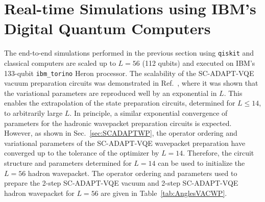 \documentclass[aps, prc, tightenlines,superscriptaddress, letterpaper, amsmath, amssymb, preprintnumbers, floatfix, longbibliography, nofootinbib]{revtex4-2}
\begin{document}
\section{Real-time Simulations using IBM's Digital Quantum Computers}
\label{sec:Qsim}
\noindent
The end-to-end simulations performed in the previous section using {\tt qiskit} and classical computers are scaled up to $L=56$ (112 qubits) 
and executed on IBM's 133-qubit {\tt ibm\_torino} Heron processor.
The scalability of the SC-ADAPT-VQE vacuum preparation circuits was demonstrated in Ref.~\cite{Farrell:2023fgd}, where it was shown that the variational parameters are reproduced well by an exponential in $L$.
This enables the extrapolation of the state preparation circuits, determined for $L\leq 14$, to arbitrarily large $L$.
In principle, a similar exponential convergence of parameters for the hadronic wavepacket preparation circuits is expected. 
However, as shown in Sec.~\ref{sec:SCADAPTWP}, the operator ordering and variational parameters of the SC-ADAPT-VQE wavepacket preparation have converged up to the tolerance of the optimizer by $L=14$. 
Therefore, the circuit structure and parameters determined for $L=14$ can be used to initialize the $L=56$ hadron wavepacket.
The operator ordering and parameters used to prepare the 
2-step SC-ADAPT-VQE vacuum and 2-step SC-ADAPT-VQE hadron wavepacket 
for $L=56$ are given in Table~\ref{tab:AnglesVACWP}.
\end{document}
